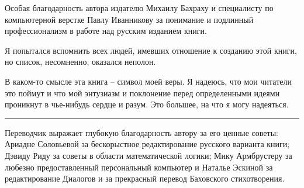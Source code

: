 \documentclass[../main.tex]{subfiles}
\begin{document}
Особая благодарность автора издателю Михаилу Бахраху и специалисту по компьютерной верстке Павлу Иванникову за понимание и подлинный профессионализм в работе над русским изданием книги.

Я попытался вспомнить всех людей, имевших отношение к созданию этой книги, но список, несомненно, оказался неполон.

В каком-то смысле эта книга \--- символ моей веры. Я надеюсь, что мои читатели это поймут и что мой энтузиазм и поклонение перед определенными идеями проникнут в чье-нибудь сердце и разум. Это большее, на что я могу надеяться.

\fancybreak{$\ast$ $\ast$ $\ast$}

Переводчик выражает глубокую благодарность автору за его ценные советы: Ариадне Соловьевой за бескорыстное редактирование русского варианта книги; Дэвиду Риду за советы в области математической логики; Мику Армбрустеру за любезно предоставленный персональный компьютер и Наталье Эскиной за редактирование Диалогов и за прекрасный перевод Баховского стихотворения.
\end{document}
